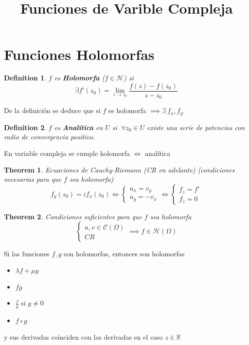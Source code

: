 \documentclass{myclass}
\title{Funciones de Varible Compleja}
\newtheorem*{definition}{Definition}
\newtheorem*{theorem}{Theorem}
\begin{document}
\maketitle
\tableofcontents
\newpage

\section{Funciones Holomorfas}
\begin{definition}
$f$ es \textbf{Holomorfa} ($f\in \mathcal{H}$) si
\[
\exists f'(z_0) = \lim_{z\to z_0} \frac{f(z)-f(z_0)}{z-z_0}
\] 
\end{definition}

De la definición se deduce que si $f$ es holomorfa  $\implies \exists \ f_x, f_y$.

\begin{definition}
$f$ es  \textbf{Analítica} en $U$ si  $\ \forall z_0\in U$ existe una serie de potencias con radio de convergencia positivo.
\end{definition}

En variable compleja se cumple holomorfa  $\iff$ analítica

\begin{theorem}
Ecuaciones de Cauchy-Riemann (CR en adelante) (condiciones necesarias para que $f$ sea holomorfa)
\[
f_y(z_0) = if_x(z_0) 
\iff 
\begin{cases}
u_x = v_y \\
u_y = -v_x
\end{cases}
\iff
\begin{cases}
f_z = f'\\
f_{\overline{z}} = 0
\end{cases}
\] 
\end{theorem}

\begin{theorem}
Condiciones suficientes para que $f$ sea holomorfa
\[
\begin{cases}
  u, v\in \mathcal{C}(\Omega) \\
  CR
\end{cases}
\implies
f\in \mathcal{H}(\Omega)
\] 
\end{theorem}
Si las funciones $f, g$ son holomorfas, entonces son holomorfas
\begin{itemize}[topsep=0pt, itemsep=0pt]
  \item $\lambda f + \mu g$ 
  \item $fg$
  \item  $\displaystyle\frac{f}{g}$ si $g\neq 0$
  \item $f\circ g$
\end{itemize}
y sus derivadas coinciden con las derivadas en el caso $z\in \mathbb{R}$
\end{document}
